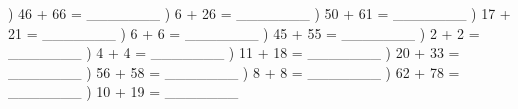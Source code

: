 \documentclass{article}%
\begin{document}
\newline%
) 46 + 66 = \_\_\_\_\_\_\_%
\newline%
\newline%
) 6 + 26 = \_\_\_\_\_\_\_%
\newline%
\newline%
) 50 + 61 = \_\_\_\_\_\_\_%
\newline%
\newline%
) 17 + 21 = \_\_\_\_\_\_\_%
\newline%
\newline%
) 6 + 6 = \_\_\_\_\_\_\_%
\newline%
\newline%
) 45 + 55 = \_\_\_\_\_\_\_%
\newline%
\newline%
) 2 + 2 = \_\_\_\_\_\_\_%
\newline%
\newline%
) 4 + 4 = \_\_\_\_\_\_\_%
\newline%
\newline%
) 11 + 18 = \_\_\_\_\_\_\_%
\newline%
\newline%
) 20 + 33 = \_\_\_\_\_\_\_%
\newline%
\newline%
) 56 + 58 = \_\_\_\_\_\_\_%
\newline%
\newline%
) 8 + 8 = \_\_\_\_\_\_\_%
\newline%
\newline%
) 62 + 78 = \_\_\_\_\_\_\_%
\newline%
\newline%
) 10 + 19 = \_\_\_\_\_\_\_%
\newline%
\newline%
\newline%
\end{document}
